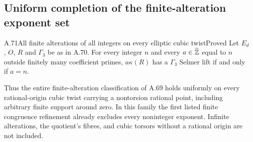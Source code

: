 \subsection{Uniform completion of the finite-alteration exponent set}

\begin{statement}{A.71}{All finite alterations of all integers on every elliptic cubic twist}{Proved}
Let $E_d$, $O$, $R$ and $\Gamma_3$ be as in A.70.
For every integer $n$ and every $a\in\widehat{\mathbb Z}$
equal to $n$ outside finitely many coefficient primes,
$a\kappa(R)$ has a $\Gamma_3$ Selmer lift if and only
if $a=n$.

Thus the entire finite-alteration classification of
A.69 holds uniformly on every rational-origin cubic
twist carrying a nontorsion rational point, including
arbitrary finite support around zero. In this family
the first listed finite congruence refinement already
excludes every noninteger exponent. Infinite
alterations, the quotient's fibres, and cubic torsors
without a rational origin are not included.
\end{statement}
